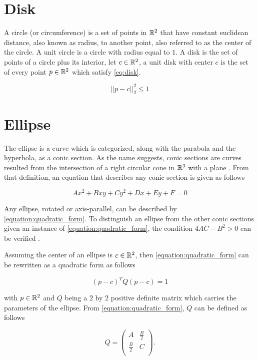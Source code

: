 \section{Disk}

A circle (or circumference) is a set of points in $\mathbb{R}^2$ that have constant euclidean distance, also known as radius, to another point, also referred to as the center of the circle. A unit circle is a circle with radius equal to $1$.
A disk is the set of points of a circle plus its interior, let $c \in \mathbb{R}^2$, a unit disk with center $c$ is the set of every point $p \in \mathbb{R}^2$ which satisfy \autoref{eq:disk}.

\begin{equation}\label{eq:disk}
||p-c||_2^2 \le 1
\end{equation} 

\section{Ellipse}

The ellipse is a curve which is categorized, along with the parabola and the hyperbola, as a conic section. As the name suggests, conic sections are curves resulted from the intersection of a right circular cone in $\mathbb{R}^3$ with a plane \cite{brannan:geometry}. From that definition, an equation that describes any conic section is given as follows

\begin{equation}\label{equation:quadratic_form}
Ax^2 + Bxy + Cy^2 + Dx + Ey + F = 0
\end{equation}

Any ellipse, rotated or axis-parallel, can be described by \autoref{equation:quadratic_form}. To distinguish an ellipse from the other conic sections given an instance of \autoref{equation:quadratic_form}, the condition $4AC - B^2>0$ can be verified \cite{ayoub}.

Assuming the center of an ellipse is $c \in \mathbb{R}^2$, then \autoref{equation:quadratic_form} can be rewritten as a quadratic form as follows

\begin{equation}
(p-c)^{T}Q(p-c) = 1
\end{equation}

with $p \in \mathbb{R}^2$ and $Q$ being a $2$ by $2$ positive definite matrix which carries the parameters of the ellipse. From \autoref{equation:quadratic_form}, $Q$ can be defined as follows

\[
Q=
\left( {\begin{array}{cc}
	A & \frac{B}{2} \\
	\frac{B}{2} & C \\
	\end{array} } \right).
\]

